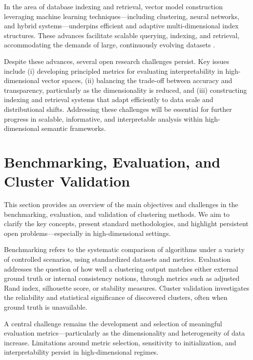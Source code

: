 \documentclass[sigconf]{acmart}
\begin{document}
In the area of database indexing and retrieval, vector model construction leveraging machine learning techniques—including clustering, neural networks, and hybrid systems—underpins efficient and adaptive multi-dimensional index structures. These advances facilitate scalable querying, indexing, and retrieval, accommodating the demands of large, continuously evolving datasets \cite{ref113}.

Despite these advances, several open research challenges persist. Key issues include (i) developing principled metrics for evaluating interpretability in high-dimensional vector spaces, (ii) balancing the trade-off between accuracy and transparency, particularly as the dimensionality is reduced, and (iii) constructing indexing and retrieval systems that adapt efficiently to data scale and distributional shifts. Addressing these challenges will be essential for further progress in scalable, informative, and interpretable analysis within high-dimensional semantic frameworks.

\section{Benchmarking, Evaluation, and Cluster Validation}

This section provides an overview of the main objectives and challenges in the benchmarking, evaluation, and validation of clustering methods. We aim to clarify the key concepts, present standard methodologies, and highlight persistent open problems---especially in high-dimensional settings.

Benchmarking refers to the systematic comparison of algorithms under a variety of controlled scenarios, using standardized datasets and metrics. Evaluation addresses the question of how well a clustering output matches either external ground truth or internal consistency notions, through metrics such as adjusted Rand index, silhouette score, or stability measures. Cluster validation investigates the reliability and statistical significance of discovered clusters, often when ground truth is unavailable.

A central challenge remains the development and selection of meaningful evaluation metrics—particularly as the dimensionality and heterogeneity of data increase. Limitations around metric selection, sensitivity to initialization, and interpretability persist in high-dimensional regimes.
\end{document}
